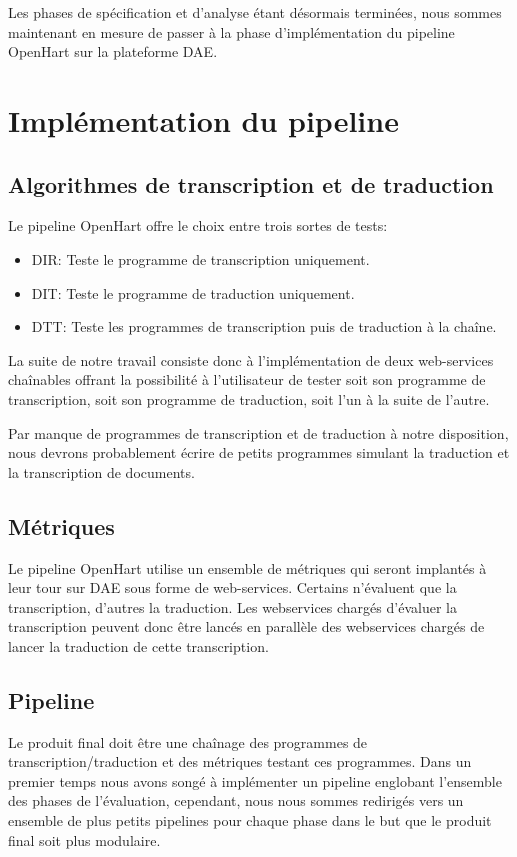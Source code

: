 Les phases de spécification et d'analyse étant désormais terminées, nous sommes maintenant en mesure de passer à la phase d'implémentation du pipeline OpenHart sur la plateforme DAE.

\section{Implémentation du pipeline}

\subsection{Algorithmes de transcription et de traduction}
Le pipeline OpenHart offre le choix entre trois sortes de tests:
\begin{itemize}
    \item DIR: Teste le programme de transcription uniquement.
    \item DIT: Teste le programme de traduction uniquement.
    \item DTT: Teste les programmes de transcription puis de traduction à la chaîne.
\end{itemize}

La suite de notre travail consiste donc à l'implémentation de deux web-services chaînables offrant la possibilité à l'utilisateur de tester soit son programme de transcription, soit son programme de traduction, soit l'un à la suite de l'autre. 

Par manque de programmes de transcription et de traduction à notre disposition, nous devrons probablement écrire de petits programmes simulant la traduction et la transcription de documents. 


\subsection{Métriques}
Le pipeline OpenHart utilise un ensemble de métriques qui seront implantés à leur tour sur DAE sous forme de web-services. Certains n'évaluent que la transcription, d'autres la traduction. Les webservices chargés d'évaluer la transcription peuvent donc être lancés en parallèle des webservices chargés de lancer la traduction de cette transcription.

\subsection{Pipeline}
Le produit final doit être une chaînage des programmes de transcription/traduction et des métriques testant ces programmes. Dans un premier temps nous avons songé à implémenter un pipeline englobant l'ensemble des phases de l'évaluation, cependant, nous nous sommes redirigés vers un ensemble de plus petits pipelines pour chaque phase dans le but que le produit final soit plus modulaire.

